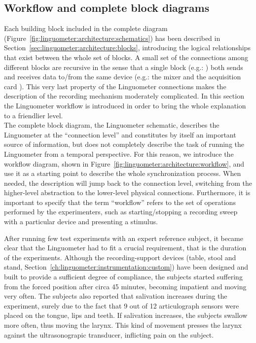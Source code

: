 \subsection{Workflow and complete block diagrams}
\label{sec:linguometer:architecture:diagram}
Each building block included in the complete diagram
(Figure~\ref{fig:linguometer:architecture:schematics}) has been described in 
Section~\ref{sec:linguometer:architecture:blocks}, introducing
the logical relationships that exist between the whole set of blocks.
A small set of the connections among different blocks are recursive in the 
sense that  a single block (e.g.: ) both sends and receives data 
to/from the same device (e.g.: the mixer  and the acquisition 
card ). This very last property of the Linguometer connections makes 
the description of the recording mechanism moderately complicated.
In this section the Linguometer workflow is introduced in order to bring the
whole explanation to a friendlier level.\\

The complete block diagram, the Linguometer schematic, describes the Linguometer
at the ``connection level'' and constitutes by itself an important source of
information, but does not completely describe the task of running
the Linguometer from a temporal perspective.
For this reason, we introduce the workflow diagram, shown
in Figure~\ref{fig:linguometer:architecture:workflow}, and use it as a
starting point to describe the whole synchronization process.
When needed, the description will jump back to the connection level, switching
from the higher-level abstraction to the lower-level physical connections.
Furthermore, it is important to specify that the term ``workflow'' refers to 
the set of operations performed by the
experimenters, such as starting/stopping a recording sweep with a particular 
device and presenting a stimulus.

After running few test experiments with an expert reference subject, it 
became clear that the Linguometer had to fit a crucial requirement, that is
the  duration of the experiments.
Although the recording-support devices (table, stool and stand,
Section~\ref{ch:linguometer:instrumentation:custom}) have been designed and 
built 
to provide a sufficient degree of compliance, the subjects started suffering
from the forced position after circa 45 minutes, becoming impatient and moving very
often. 
The subjects also reported that salivation increases during the experiment,
surely due to the fact that 9 out of 12 articulograph sensors were placed on the
tongue, lips and teeth.
If salivation increases, the subjects swallow more often, thus moving the
larynx. This kind of movement presses the
larynx against the ultrasonograpic transducer, inflicting pain on the subject.

